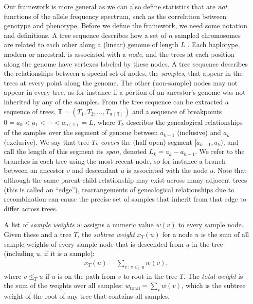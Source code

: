 \documentclass{article}
\newcommand{\treeseq}{\mathbb{T}} %
\newcommand{\iw}{w} %
\newcommand{\tiw}{w_\text{total}} %
\newcommand{\nw}{x} %
\begin{document}
Our framework is more general as we can also define statistics that are
\emph{not} functions of the allele frequency spectrum, such as the correlation between genotype and phenotype.
Before we define the framework, we need some notation and definitions.
A tree sequence describes how a set of $n$ sampled chromosomes
are related to each other along a (linear) genome of length $L$ \citep{kelleher2016efficient,kelleher2018efficient}.
Each haplotype, modern or ancestral, is associated with a \emph{node},
and the trees at each position along the genome have vertexes labeled by these nodes.
A tree sequence describes the relationships between a special set of nodes, the \emph{samples},
that appear in the trees at every point along the genome.
The other (non-sample) nodes may not appear in every tree,
as for instance if a portion of an ancestor's genome was not inherited by any of the samples.
From the tree sequence can be extracted a sequence of trees,
$\treeseq = (T_1, T_2, \ldots, T_{n(\treeseq)})$
and a sequence of breakpoints $0 = a_0 < a_1 < \cdots < a_{n(\treeseq)} = L$,
where $T_k$ describes the genealogical relationships of the samples
over the segment of genome between $a_{k-1}$ (inclusive) and $a_k$ (exclusive).
We say that tree $T_k$ \emph{covers} the (half-open) segment $[a_{k-1}, a_k)$,
and call the length of this segment its \emph{span}, denoted $L_k = a_k - a_{k-1}$.
We refer to the branches in each tree using the most recent node,
so for instance a branch between an ancestor $v$ and descendant $u$
is associated with the node $u$.
Note that although the same parent-child relationship may exist across many adjacent trees
(this is called an ``edge''),
rearrangements of genealogical relationships due to recombination
can cause the precise set of samples that inherit from that edge to differ across trees.

\begin{definition} \label{defn:weights}
    A list of \emph{sample weights} $\iw$ assigns a numeric value $\iw(v)$
    to every sample node.
    Given these and a tree $T$,
    the \emph{subtree weight} $\nw_T(u)$ for a node $u$ is the sum of all sample weights
    of every sample node that is descended from $u$ in the tree (including $u$, if it is a sample):
    \begin{align*}
        \nw_T(u) = \sum_{v \,:\, v \le_T u} \iw(v) ,
    \end{align*}
    where $v \le_T u$ if $u$ is on the path from $v$ to root in the tree $T$.
    The \emph{total weight} is the sum of the weights over all samples:
    $\tiw = \sum_v \iw(v)$, which is the subtree weight of the root of any tree
    that contains all samples.
\end{definition}
\end{document}

